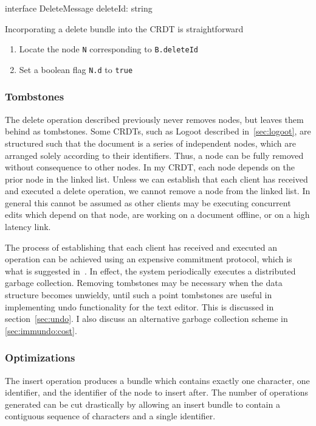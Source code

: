 \documentclass[12pt,a4paper,twoside,openright]{report}
\begin{document}
\vspace{3mm}
\begin{typescript}
interface DeleteMessage {
    deleteId: string
}
\end{typescript}				
				
				Incorporating a delete bundle into the CRDT is straightforward
				\begin{enumerate}
					\item Locate the node \texttt{N} corresponding to \texttt{B.deleteId}
					\item Set a boolean flag \texttt{N.d} to \texttt{true}
				\end{enumerate}
				
		\subsubsection{Tombstones}
			The delete operation described previously never removes nodes, but leaves them behind as tombstones. Some CRDTs, such as Logoot described in~\cref{sec:logoot}, are structured such that the document is a series of independent nodes, which are arranged solely according to their identifiers. Thus, a node can be fully removed without consequence to other nodes. In my CRDT, each node depends on the prior node in the linked list. Unless we can establish that each client has received and executed a delete operation, we cannot remove a node from the linked list. In general this cannot be assumed as other clients may be executing concurrent edits which depend on that node, are working on a document offline, or on a high latency link.
			
			The process of establishing that each client has received and executed an operation can be achieved using an expensive commitment protocol, which is what is suggested in~\cite{preguica2009}. In effect, the system periodically executes a distributed garbage collection. Removing tombstones may be necessary when the data structure becomes unwieldy, until such a point tombstones are useful in implementing undo functionality for the text editor. This is discussed in section~\cref{sec:undo}. I also discuss an alternative garbage collection scheme in \cref{sec:immundo:cost}.
			
		
		\subsubsection{Optimizations}
			The insert operation produces a bundle which contains exactly one character, one identifier, and the identifier of the node to insert after. The number of operations generated can be cut drastically by allowing an insert bundle to contain a contiguous sequence of characters and a single identifier.
			
\end{document}
